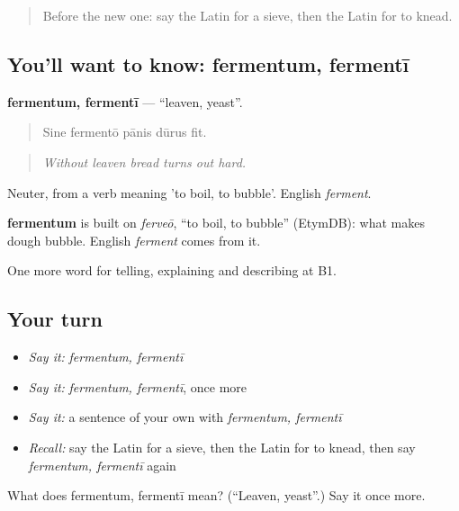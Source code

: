 \begin{quote}
Before the new one: say the Latin for a sieve, then the Latin for to knead.
\end{quote}

\subsection*{You'll want to know: fermentum, fermentī}
\textbf{fermentum, fermentī} — \textquotedblleft{}leaven, yeast\textquotedblright{}.

\begin{quote}
Sine fermentō pānis dūrus fit.
\end{quote}

\begin{quote}
\emph{Without leaven bread turns out hard.}
\end{quote}

Neuter, from a verb meaning 'to boil, to bubble'. English \emph{ferment}.

\begin{cousinweb}
\textbf{fermentum} is built on \emph{ferveō}, \textquotedblleft{}to boil, to bubble\textquotedblright{} (EtymDB): what makes dough bubble. English \emph{ferment} comes from it.
\end{cousinweb}

\begin{grammarlens}[title={What you've built}]
One more word for telling, explaining and describing at B1.
\end{grammarlens}

\subsection*{Your turn}
\begin{itemize}
\raggedright
  \item \emph{Say it:} \emph{fermentum, fermentī}
  \item \emph{Say it:} \emph{fermentum, fermentī}, once more
  \item \emph{Say it:} a sentence of your own with \emph{fermentum, fermentī}
  \item \emph{Recall:} say the Latin for a sieve, then the Latin for to knead, then say \emph{fermentum, fermentī} again
\end{itemize}

\begin{tcolorbox}[breakable,colback=teal!4,colframe=teal!35!black,title={Before you move on}]
What does fermentum, fermentī mean? (\textquotedblleft{}Leaven, yeast\textquotedblright{}.) Say it once more.
\end{tcolorbox}

